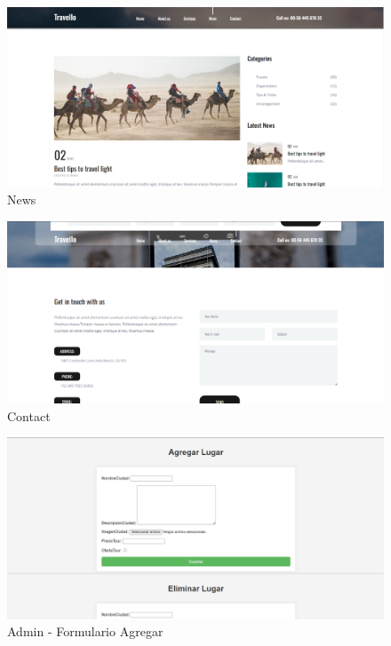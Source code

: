 \documentclass{article}
\begin{document}
  \newpage
  \begin{figure}[H]
    \centering
    \includegraphics[width=1\textwidth, keepaspectratio]{img/ejecucion4.png}
    \caption{News}
  \end{figure}
  \begin{figure}[H]
    \centering
    \includegraphics[width=1\textwidth, keepaspectratio]{img/ejecucion5.png}
    \caption{Contact}
  \end{figure}
  \newpage
  \begin{figure}[H]
    \centering
    \includegraphics[width=1\textwidth, keepaspectratio]{img/ejecucion6.png}
    \caption{Admin - Formulario Agregar}
  \end{figure}
\end{document}
